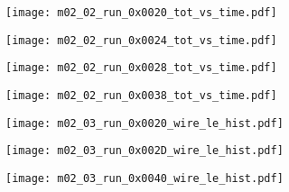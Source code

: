 \documentclass[11pt, ngerman, fleqn, DIV=15, headinclude, BCOR=2cm]{scrreprt}
\begin{document}
\begin{appendix}
	\begin{figure}
		\centering
	\begin{subfigure}[a]{0.45 \textwidth}
		\texttt{[image: m02\_02\_run\_0x0020\_tot\_vs\_time.pdf]}
		\caption{%
		}
		\label{fig:m02_02_run_0x0020_tot_vs_time}
	\end{subfigure}
	\begin{subfigure}[a]{0.45 \textwidth}
		\texttt{[image: m02\_02\_run\_0x0024\_tot\_vs\_time.pdf]}
		\caption{%
		}
		\label{fig:m02_02_run_0x0024_tot_vs_time}
	\end{subfigure}
	\begin{subfigure}[a]{0.45 \textwidth}
		\texttt{[image: m02\_02\_run\_0x0028\_tot\_vs\_time.pdf]}
		\caption{%
		}
		\label{fig:m02_02_run_0x0028_tot_vs_time}
	\end{subfigure}
	\begin{subfigure}[a]{0.45 \textwidth}
		\texttt{[image: m02\_02\_run\_0x0038\_tot\_vs\_time.pdf]}
		\caption{%
		}
		\label{fig:m02_02_run_0x0038_tot_vs_time}
	\end{subfigure}
	\caption{%
	}
	\label{fig:m02_02_tot_vs_time}
	\end{figure}
	\clearpage



	\begin{figure}
		\centering
	\begin{subfigure}[a]{0.45 \textwidth}
		\texttt{[image: m02\_03\_run\_0x0020\_wire\_le\_hist.pdf]}
		\caption{%
		}
		\label{fig:m02_03_run_0x0020_wire_le_hist}
	\end{subfigure}
	\begin{subfigure}[a]{0.45 \textwidth}
		\centering
		\texttt{[image: m02\_03\_run\_0x002D\_wire\_le\_hist.pdf]}
		\caption{%
		}
		\label{fig:m02_03_run_0x002D_wire_le_hist}
	\end{subfigure}
	\begin{subfigure}[a]{0.45 \textwidth}
		\centering
		\texttt{[image: m02\_03\_run\_0x0040\_wire\_le\_hist.pdf]}
		\caption{%
		}
		\label{fig:m02_03_run_0x0040_wire_le_hist}
	\end{subfigure}
	\caption{%
	}
	\label{fig:m02_03_wire_le_hist}
	\end{figure}



\end{appendix}
\end{document}
